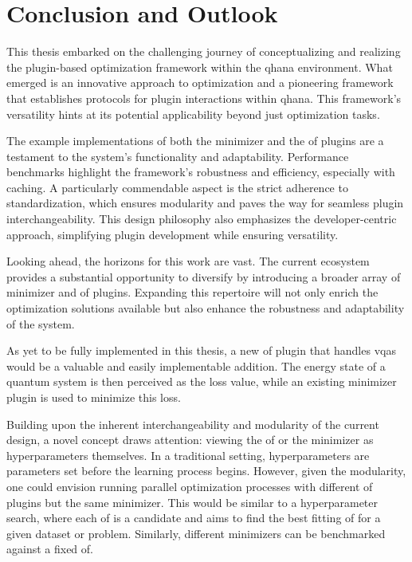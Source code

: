 \documentclass[
  a4paper,  %
  twoside,  %
  bibliography=totoc,
  headsepline,
  cleardoublepage=empty,
  parskip=half,
  draft=false
]{scrbook}
\begin{document}
{\chapter{Conclusion and Outlook}
\label{chap:conclusion}

This thesis embarked on the challenging journey of conceptualizing and realizing the plugin-based optimization framework within the \gls{qhana} environment.
What emerged is an innovative approach to optimization and a pioneering framework that establishes protocols for plugin interactions within \gls{qhana}.
This framework's versatility hints at its potential applicability beyond just optimization tasks.

The example implementations of both the minimizer and the \gls{of} plugins are a testament to the system's functionality and adaptability.
Performance benchmarks highlight the framework's robustness and efficiency, especially with caching.
A particularly commendable aspect is the strict adherence to standardization, which ensures modularity and paves the way for seamless plugin interchangeability.
This design philosophy also emphasizes the developer-centric approach, simplifying plugin development while ensuring versatility.

Looking ahead, the horizons for this work are vast.
The current ecosystem provides a substantial opportunity to diversify by introducing a broader array of minimizer and \gls{of} plugins.
Expanding this repertoire will not only enrich the optimization solutions available but also enhance the robustness and adaptability of the system.

As yet to be fully implemented in this thesis, a new \gls{of} plugin that handles \glspl{vqa} would be a valuable and easily implementable addition.
The energy state of a quantum system is then perceived as the loss value, while an existing minimizer plugin is used to minimize this loss.

Building upon the inherent interchangeability and modularity of the current design, a novel concept draws attention: viewing the \gls{of} or the minimizer as hyperparameters themselves.
In a traditional setting, hyperparameters are parameters set before the learning process begins.
However, given the modularity, one could envision running parallel optimization processes with different \gls{of} plugins but the same minimizer.
This would be similar to a hyperparameter search, where each \gls{of} is a candidate and aims to find the best fitting \gls{of} for a given dataset or problem.
Similarly, different minimizers can be benchmarked against a fixed \gls{of}.

}
\end{document}

